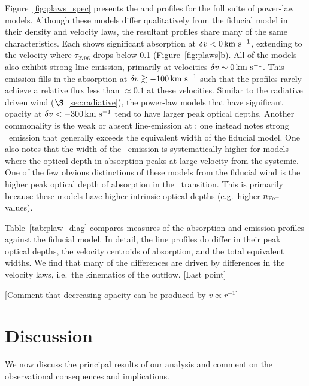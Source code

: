 \documentclass[12pt,preprint]{aastex}
\begin{document}
Figure~\ref{fig:plaws_spec} presents the  and 
profiles for the full suite of power-law models.  Although these
models differ qualitatively from the fiducial model in their density
and velocity laws, the resultant profiles share many of the same
characteristics.  Each shows significant absorption at $\delta v < 0
\, {\rm km~s^{-1}}$, extending to the velocity where $\tau_{2796}$ drops below 0.1
(Figure~\ref{fig:plaws}b).  All of the models also exhibit strong
line-emission, primarily at velocities $\delta v \sim 0 \, {\rm km~s^{-1}}$.  
This emission fills-in the  absorption at $\delta v \gtrsim
-100 \, {\rm km~s^{-1}}$ such that the profiles rarely achieve a relative flux less
than $\approx 0.1$ at these velocities. 
Similar to the radiative driven wind ($\S$~\ref{sec:radiative}),
the power-law models that have significant opacity at $\delta v <
-300 \, {\rm km~s^{-1}}$ tend to have larger peak optical depths.  Another commonality is
the weak or absent line-emission at \feiia; one instead notes strong
\feiic\ emission that generally exceeds the equivalent width of the
fiducial model.  One also notes that the width of the \feiis\ emission
is systematically higher for models where the optical depth in
absorption peaks at large velocity from the systemic.
One of the few obvious distinctions of these models from the fiducial wind is
the higher peak optical depth of absorption in the \feiib\
transition.  This is primarily because these models have 
higher intrinsic optical depths (e.g.\ higher $n_{\rm Fe^+}$ values).

Table~\ref{tab:plaw_diag} compares measures of the absorption and
emission profiles against the fiducial model.
In detail, the line profiles do differ in their peak optical depths,
the velocity centroids of absorption, and the total equivalent widths.
We find that many of the differences are driven by differences in
the velocity laws, i.e.\ the kinematics of the outflow.
[Last point]

[Comment that decreasing opacity can be produced by $v \propto
r^{-1}$]

\section{Discussion}
\label{sec:discuss}

We now discuss the principal results of our analysis and comment on
the observational consequences and implications. 
\end{document}
